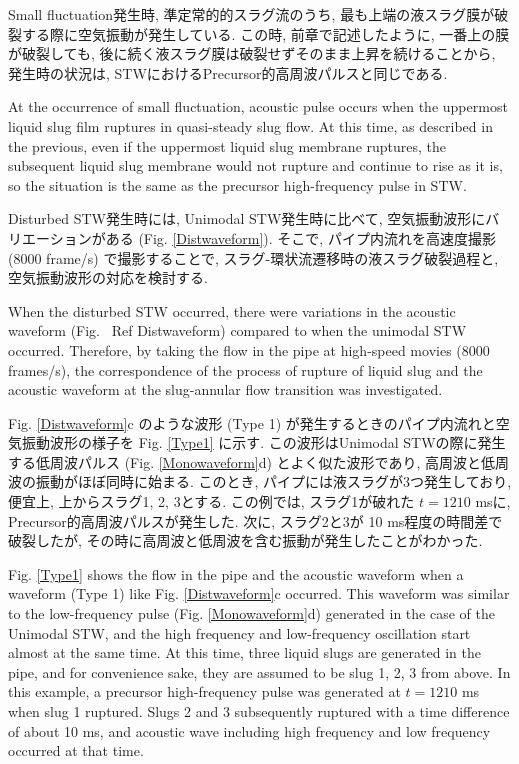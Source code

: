 \documentclass[12pt]{article}
\begin{document}
Small fluctuation発生時, 準定常的的スラグ流のうち, 最も上端の液スラグ膜が破裂する際に空気振動が発生している. この時, 前章で記述したように, 一番上の膜が破裂しても, 後に続く液スラグ膜は破裂せずそのまま上昇を続けることから, 発生時の状況は, STWにおけるPrecursor的高周波パルスと同じである.

At the occurrence of small fluctuation, acoustic pulse occurs when the uppermost liquid slug film ruptures in quasi-steady slug flow. 
At this time, as described in the previous, even if the uppermost liquid slug membrane ruptures, the subsequent liquid slug membrane would not rupture and continue to rise as it is, so the situation is the same as the precursor high-frequency pulse in STW.

Disturbed STW発生時には, Unimodal STW発生時に比べて, 空気振動波形にバリエーションがある (Fig. \ref{Distwaveform}). 
そこで, パイプ内流れを高速度撮影 (8000 frame/s) で撮影することで, スラグ-環状流遷移時の液スラグ破裂過程と, 空気振動波形の対応を検討する.

When the disturbed STW occurred, there were variations in the acoustic waveform (Fig. \ Ref {Distwaveform}) compared to when the unimodal STW occurred.
Therefore, by taking the flow in the pipe at high-speed movies (8000 frames/s), the correspondence of the process of rupture of liquid slug and the acoustic waveform at the slug-annular flow transition was investigated.

Fig. \ref{Distwaveform}c のような波形 (Type 1) が発生するときのパイプ内流れと空気振動波形の様子を Fig. \ref{Type1} に示す. 
この波形はUnimodal STWの際に発生する低周波パルス (Fig. \ref{Monowaveform}d) とよく似た波形であり, 高周波と低周波の振動がほぼ同時に始まる. 
このとき, パイプには液スラグが3つ発生しており, 便宜上, 上からスラグ1, 2, 3とする. 
この例では, スラグ1が破れた $t=1210$ msに, Precursor的高周波パルスが発生した. 
次に, スラグ2と3が 10 ms程度の時間差で破裂したが, その時に高周波と低周波を含む振動が発生したことがわかった.

Fig. \ref{Type1} shows the flow in the pipe and the acoustic waveform when a waveform (Type 1) like Fig. \ref {Distwaveform}c occurred.
This waveform was similar to the low-frequency pulse (Fig. \ref {Monowaveform}d) generated in the case of the Unimodal STW, and the high frequency and low-frequency oscillation start almost at the same time.
At this time, three liquid slugs are generated in the pipe, and for convenience sake, they are assumed to be slug 1, 2, 3 from above.
In this example, a precursor high-frequency pulse was generated at $t = 1210$ ms when slug 1 ruptured.
Slugs 2 and 3 subsequently ruptured with a time difference of about 10 ms, and acoustic wave including high frequency and low frequency occurred at that time.
\end{document}
